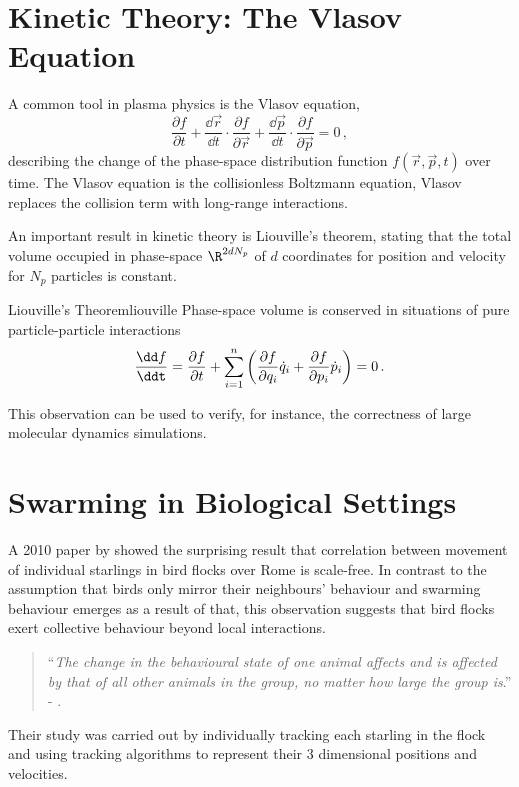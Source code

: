 
\section{Kinetic Theory: The Vlasov Equation}
A common tool in plasma physics is the Vlasov equation,
$$\frac{\partial f}{\partial t}+{\frac {\dd \vec{r} }{\dd t}}\cdot {\frac {\partial f}{\partial \vec{r} }}+{\frac {\dd \vec{p} }{\dd t}}\cdot {\frac {\partial f}{\partial \vec{p} }}=0\,,$$
describing the change of the phase-space distribution function $f(\vec{r}, \vec{p}, t)$ over time.
The Vlasov equation is the collisionless Boltzmann equation, Vlasov replaces the collision term with long-range interactions.

An important result in kinetic theory is Liouville's theorem, stating that the total volume occupied in phase-space $\R^{2dN_p}$ of $d$ coordinates for position and velocity for $N_p$ particles is constant.

\begin{theorem}{Liouville's Theorem}{liouville}
  Phase-space volume is conserved in situations of pure particle-particle interactions
  $$\frac{\dd f}{\ddt}=
    \frac{\partial f}{\partial t}
    +\sum_{i=1}^n\left(\frac{\partial f}{\partial q_i}\dot{q}_i
    +\frac{\partial f}{\partial p_i}\dot{p}_i\right)=0\,.$$
\end{theorem}

This observation can be used to verify, for instance, the correctness of large molecular dynamics simulations.

\section{Swarming in Biological Settings}
A 2010 paper by \citeauthor{2010-starlings} showed the surprising result that correlation between movement of individual starlings in bird flocks over Rome is scale-free.
In contrast to the assumption that birds only mirror their neighbours' behaviour and swarming behaviour emerges as a result of that, this observation suggests that bird flocks exert collective behaviour beyond local interactions.
\begin{quote}
  ``\textit{The change in the behavioural state of one animal affects and is affected by that of all other animals in the group, no matter how large the group is}.'' - \cite{2010-starlings}.
\end{quote}
Their study was carried out by individually tracking each starling in the flock and using tracking algorithms to represent their 3 dimensional positions and velocities.


